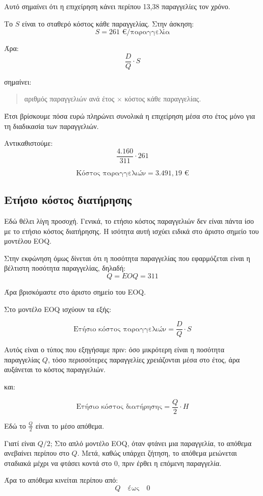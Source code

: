 \documentclass[12pt,a4paper]{article}
\begin{document}
Αυτό σημαίνει ότι η επιχείρηση κάνει περίπου 13,38 παραγγελίες τον χρόνο.

Το \(S\) είναι το σταθερό κόστος κάθε παραγγελίας. Στην άσκηση:
\[
S=261 \text{ €/παραγγελία}
\]

Άρα:
\[
\frac{D}{Q}\cdot S
\]

σημαίνει:

\begin{quote}
αριθμός παραγγελιών ανά έτος \(\times\) κόστος κάθε παραγγελίας.
\end{quote}

Έτσι βρίσκουμε πόσα ευρώ πληρώνει συνολικά η επιχείρηση μέσα στο έτος μόνο για τη διαδικασία των παραγγελιών.

Αντικαθιστούμε:
\[
\frac{4.160}{311}\cdot261
\]

\[
\boxed{\text{Κόστος παραγγελιών}=3.491{,}19 \text{ €}}
\]

\subsection{Ετήσιο κόστος διατήρησης}

Εδώ θέλει λίγη προσοχή. Γενικά, το ετήσιο κόστος παραγγελιών δεν είναι πάντα ίσο με το ετήσιο κόστος διατήρησης. Η ισότητα αυτή ισχύει ειδικά στο άριστο σημείο του μοντέλου EOQ.

Στην εκφώνηση όμως δίνεται ότι η ποσότητα παραγγελίας που εφαρμόζεται είναι η βέλτιστη ποσότητα παραγγελίας, δηλαδή:
\[
Q=EOQ=311
\]

Άρα βρισκόμαστε στο άριστο σημείο του EOQ.

Στο μοντέλο EOQ ισχύουν τα εξής:

\[
\text{Ετήσιο κόστος παραγγελιών}=\frac{D}{Q}\cdot S
\]

Αυτός είναι ο τύπος που εξηγήσαμε πριν: όσο μικρότερη είναι η ποσότητα παραγγελίας \(Q\), τόσο περισσότερες παραγγελίες χρειάζονται μέσα στο έτος, άρα αυξάνεται το κόστος παραγγελιών.

και:

\[
\text{Ετήσιο κόστος διατήρησης}=\frac{Q}{2}\cdot H
\]

Εδώ το \(\frac{Q}{2}\) είναι το μέσο απόθεμα.

Γιατί είναι \(Q/2\); Στο απλό μοντέλο EOQ, όταν φτάνει μια παραγγελία, το απόθεμα ανεβαίνει περίπου στο \(Q\). Μετά, καθώς υπάρχει ζήτηση, το απόθεμα μειώνεται σταδιακά μέχρι να φτάσει κοντά στο 0, πριν έρθει η επόμενη παραγγελία.

Άρα το απόθεμα κινείται περίπου από:
\[
Q \quad \text{έως} \quad 0
\]
\end{document}
